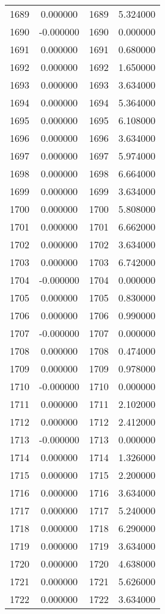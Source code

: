 \documentclass[12pt]{article}
\begin{document}
\begin{longtable}{@{}cccc@{}}
1689 & 0.000000 & 1689 & 5.324000 \\
1690 & -0.000000 & 1690 & 0.000000 \\
1691 & 0.000000 & 1691 & 0.680000 \\
1692 & 0.000000 & 1692 & 1.650000 \\
1693 & 0.000000 & 1693 & 3.634000 \\
1694 & 0.000000 & 1694 & 5.364000 \\
1695 & 0.000000 & 1695 & 6.108000 \\
1696 & 0.000000 & 1696 & 3.634000 \\
1697 & 0.000000 & 1697 & 5.974000 \\
1698 & 0.000000 & 1698 & 6.664000 \\
1699 & 0.000000 & 1699 & 3.634000 \\
1700 & 0.000000 & 1700 & 5.808000 \\
1701 & 0.000000 & 1701 & 6.662000 \\
1702 & 0.000000 & 1702 & 3.634000 \\
1703 & 0.000000 & 1703 & 6.742000 \\
1704 & -0.000000 & 1704 & 0.000000 \\
1705 & 0.000000 & 1705 & 0.830000 \\
1706 & 0.000000 & 1706 & 0.990000 \\
1707 & -0.000000 & 1707 & 0.000000 \\
1708 & 0.000000 & 1708 & 0.474000 \\
1709 & 0.000000 & 1709 & 0.978000 \\
1710 & -0.000000 & 1710 & 0.000000 \\
1711 & 0.000000 & 1711 & 2.102000 \\
1712 & 0.000000 & 1712 & 2.412000 \\
1713 & -0.000000 & 1713 & 0.000000 \\
1714 & 0.000000 & 1714 & 1.326000 \\
1715 & 0.000000 & 1715 & 2.200000 \\
1716 & 0.000000 & 1716 & 3.634000 \\
1717 & 0.000000 & 1717 & 5.240000 \\
1718 & 0.000000 & 1718 & 6.290000 \\
1719 & 0.000000 & 1719 & 3.634000 \\
1720 & 0.000000 & 1720 & 4.638000 \\
1721 & 0.000000 & 1721 & 5.626000 \\
1722 & 0.000000 & 1722 & 3.634000 \\

\end{longtable}
\end{document}
